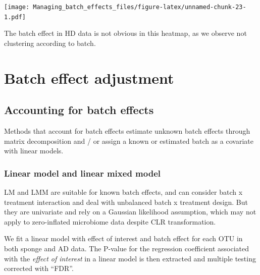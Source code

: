 \documentclass[]{book}
\begin{document}
\texttt{[image: Managing\_batch\_effects\_files/figure-latex/unnamed-chunk-23-1.pdf]}

The batch effect in HD data is not obvious in this heatmap, as we
observe not clustering according to batch.

\chapter{Batch effect adjustment}\label{adjust}

\section{Accounting for batch
effects}\label{accounting-for-batch-effects}

Methods that account for batch effects estimate unknown batch effects
through matrix decomposition and / or assign a known or estimated batch
as a covariate with linear models.

\subsection{Linear model and linear mixed
model}\label{linear-model-and-linear-mixed-model}

LM and LMM are suitable for known batch effects, and can consider batch
x treatment interaction and deal with unbalanced batch x treatment
design. But they are univariate and rely on a Gaussian likelihood
assumption, which may not apply to zero-inflated microbiome data despite
CLR transformation.

We fit a linear model with effect of interest and batch effect for each
OTU in both sponge and AD data. The P-value for the regression
coefficient associated with the \emph{effect of interest} in a linear
model is then extracted and multiple testing corrected with ``FDR''.
\end{document}
